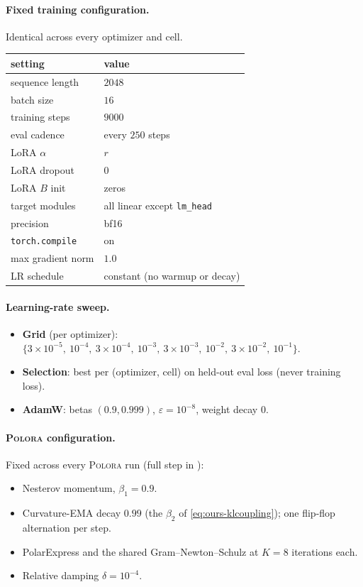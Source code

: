 \documentclass[11pt]{article}
\newcommand{\methodname}{\textsc{Polora}\xspace}
\theoremstyle{plain}
\theoremstyle{definition}
\theoremstyle{remark}
\begin{document}
\paragraph{Fixed training configuration.} Identical across every optimizer and cell.
\begin{table}[h]
\centering\small
\begin{tabular}{@{}ll@{}}
\toprule
setting & value \\
\midrule
sequence length       & $2048$ \\
batch size             & $16$ \\
training steps         & $9000$ \\
eval cadence           & every $250$ steps \\
LoRA $\alpha$          & $r$ \\
LoRA dropout           & $0$ \\
LoRA $B$ init          & zeros \\
target modules         & all linear except \texttt{lm\_head} \\
precision              & bf16 \\
\texttt{torch.compile} & on \\
max gradient norm      & $1.0$ \\
LR schedule            & constant (no warmup or decay) \\
\bottomrule
\end{tabular}
\end{table}

\paragraph{Learning-rate sweep.}
\begin{itemize}[leftmargin=1.5em,itemsep=1pt,topsep=2pt]
  \item \textbf{Grid} (per optimizer): $\{3{\times}10^{-5},\ 10^{-4},\ 3{\times}10^{-4},\ 10^{-3},\ 3{\times}10^{-3},\ 10^{-2},\ 3{\times}10^{-2},\ 10^{-1}\}$.
  \item \textbf{Selection}: best per (optimizer, cell) on held-out eval loss (never training loss).
  \item \textbf{AdamW}: betas $(0.9,0.999)$, $\varepsilon{=}10^{-8}$, weight decay $0$.
\end{itemize}

\paragraph{\methodname{} configuration.} Fixed across every \methodname{} run (full step in ):
\begin{itemize}[leftmargin=1.5em,itemsep=1pt,topsep=2pt]
  \item Nesterov momentum, $\beta_1{=}0.9$.
  \item Curvature-EMA decay $0.99$ (the $\beta_2$ of \eqref{eq:ours-klcoupling}); one flip-flop alternation per step.
  \item PolarExpress and the shared Gram--Newton--Schulz at $K{=}8$ iterations each.
  \item Relative damping $\delta{=}10^{-4}$.
\end{itemize}
\end{document}
